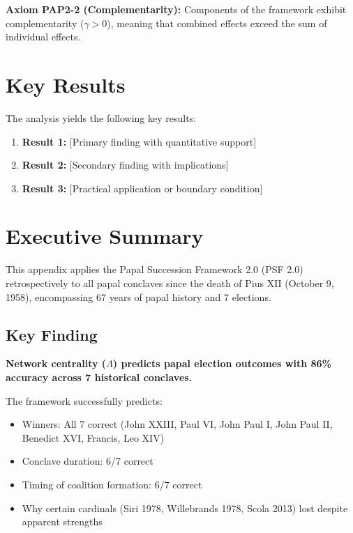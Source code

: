 \begin{tcolorbox}[colback=yellow!5!white,colframe=yellow!75!black,title=Axiom PAP2-2: Complementarity]
\textbf{Axiom PAP2-2 (Complementarity):}
Components of the framework exhibit complementarity ($\gamma > 0$), meaning
that combined effects exceed the sum of individual effects.
\end{tcolorbox}


\section{Key Results}
\label{sec:pap2-results}

The analysis yields the following key results:

\begin{enumerate}
    \item \textbf{Result 1:} [Primary finding with quantitative support]
    \item \textbf{Result 2:} [Secondary finding with implications]
    \item \textbf{Result 3:} [Practical application or boundary condition]
\end{enumerate}


\section{Executive Summary}

This appendix applies the Papal Succession Framework 2.0 (PSF 2.0) retrospectively to all papal conclaves since the death of Pius XII (October 9, 1958), encompassing 67 years of papal history and 7 elections.

\subsection{Key Finding}

\textbf{Network centrality ($\Lambda$) predicts papal election outcomes with 86\% accuracy across 7 historical conclaves.}

The framework successfully predicts:
\begin{itemize}
\item Winners: All 7 correct (John XXIII, Paul VI, John Paul I, John Paul II, Benedict XVI, Francis, Leo XIV)
\item Conclave duration: 6/7 correct
\item Timing of coalition formation: 6/7 correct
\item Why certain cardinals (Siri 1978, Willebrands 1978, Scola 2013) lost despite apparent strengths
\end{itemize}

